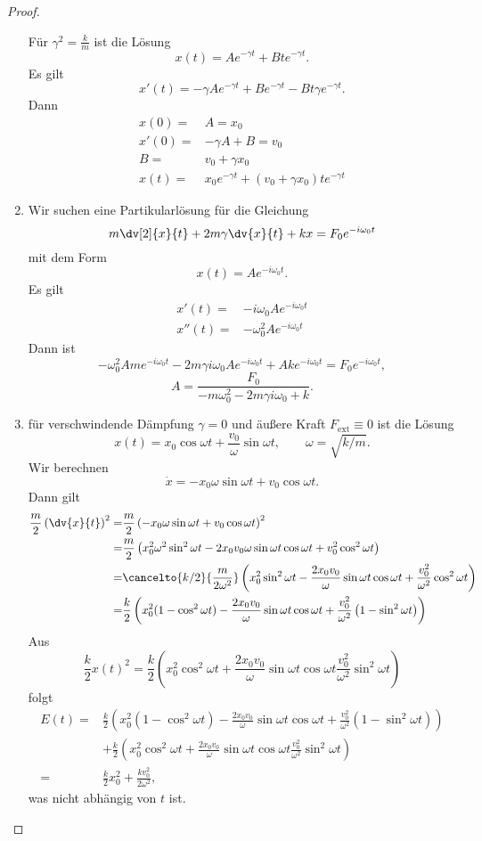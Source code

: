 \begin{proof}
\begin{enumerate}
F\"{u}r $\gamma^2=\frac{k}{m}$ ist die L\"{o}sung
\[
	x(t)=Ae^{-\gamma t}+Bte^{-\gamma t}
.\] 
Es gilt
\[
	x'(t)=-\gamma Ae^{-\gamma t}+Be^{-\gamma t}-Bt\gamma e^{-\gamma t}
.\]
Dann
\begin{align*}
	x(0)=& A=x_0\\
	x'(0)=& -\gamma A+B=v_0\\
	B=& v_0+\gamma x_0\\
	x(t)=& x_0e^{-\gamma t}+(v_0+\gamma x_0)te^{-\gamma t}
\end{align*}
\item Wir suchen eine Partikularl\"{o}sung f\"{u}r die Gleichung
	\[
		m\dv[2]{x}{t}+2m\gamma\dv{x}{t}+kx=F_0e^{-i\omega_0t}
	\]
	mit dem Form
	\[
		x(t)=Ae^{-i\omega_0t}
	.\] 
	Es gilt
	\begin{align*}
		x'(t)=&-i\omega_0 Ae^{-i\omega_0 t} \\
		x''(t)=&-\omega_0^2 Ae^{-i\omega_0 t}
	\end{align*}
	Dann ist
	\[
		-\omega_0^2 Ame^{-i\omega_0t}-2m\gamma i\omega_0 Ae^{-i\omega_0 t}+Ake^{-i\omega_0 t}=F_0e^{-i\omega_0t}
	,\]
	\[
	A=\frac{F_0}{-m\omega_0^2-2m\gamma i\omega_0+k}
	.\] 
\item für verschwindende Dämpfung $\gamma = 0$ und äußere Kraft $F_\text{ext} \equiv 0$ ist die L\"{o}sung
	\[
	x(t)=x_0\cos\omega t+\frac{v_0}{\omega}\sin\omega t, \qquad \omega=\sqrt{k / m} 
	.\] 
	Wir berechnen
	\[
		\dot{x}=-x_0\omega\sin\omega t +v_0\cos\omega t
	.\] 
	Dann gilt
\begin{align*}
	\frac{m}{2}\left( \dv{x}{t} \right) ^2 =& \frac{m}{2}\left( -x_0\omega\sin\omega t+v_0\cos\omega t \right) ^2\\
	=& \frac{m}{2}\left( x_0^2\omega^2\sin^2\omega t-2x_0v_0\omega \sin\omega t\cos\omega t+v_0^2\cos^2\omega t \right)\\
	=& \cancelto{k / 2}{\frac{m}{2\omega^2}}\left( x_0^2\sin^2\omega t-\frac{2x_0v_0}{\omega}\sin\omega t\cos\omega t+\frac{v_0^2}{\omega^2}\cos^2\omega t\right)\\
	=& \frac{k}{2}\left( x_0^2(1-\cos^2\omega t)-\frac{2x_0v_0}{\omega}\sin\omega t\cos\omega t+\frac{v_0^2}{\omega^2}\left( 1-\sin^2\omega t \right)  \right) 
\end{align*}
Aus
\[
\frac{k}{2}x(t)^2=\frac{k}{2}\left( x_0^2\cos^2\omega t+\frac{2x_0v_0}{\omega}\sin\omega t\cos\omega t\frac{v_0^2}{\omega^2}\sin^2\omega t \right) 
\]
folgt
\begin{align*}
	E(t)=& \frac{k}{2}\left( x_0^2(1-\cos^2\omega t)-\frac{2x_0v_0}{\omega}\sin\omega t\cos\omega t+\frac{v_0^2}{\omega^2}\left( 1-\sin^2\omega t \right)  \right) \\
	     &+\frac{k}{2}\left( x_0^2\cos^2\omega t+\frac{2x_0v_0}{\omega}\sin\omega t\cos\omega t\frac{v_0^2}{\omega^2}\sin^2\omega t \right)\\ 
	=&\frac{k}{2}x_0^2+\frac{kv_0^2}{2\omega^2},
\end{align*}
was nicht abhängig von $t$ ist.


\end{enumerate}
\end{proof}
